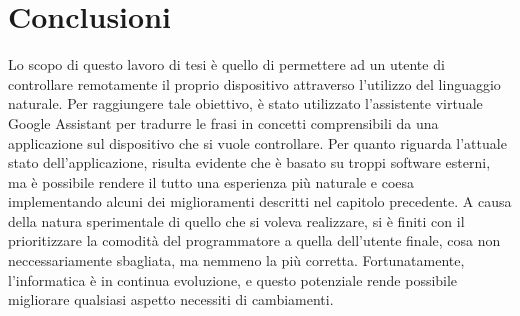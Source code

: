 \chapter{Conclusioni}
Lo scopo di questo lavoro di tesi è quello di permettere ad un utente di controllare remotamente il proprio dispositivo attraverso l'utilizzo del linguaggio naturale. 
Per raggiungere tale obiettivo, è stato utilizzato l'assistente virtuale Google Assistant per tradurre le frasi in concetti comprensibili da una applicazione sul dispositivo che si vuole controllare. 
Per quanto riguarda l'attuale stato dell'applicazione, risulta evidente che è basato su troppi software esterni, ma è possibile rendere il tutto una esperienza più naturale e coesa implementando alcuni dei miglioramenti descritti nel capitolo precedente. 
A causa della natura sperimentale di quello che si voleva realizzare, si è finiti con il prioritizzare la comodità del programmatore a quella dell'utente finale, cosa non neccessariamente sbagliata, ma nemmeno la più corretta. 
Fortunatamente, l'informatica è in continua evoluzione, e questo potenziale rende possibile migliorare qualsiasi aspetto necessiti di cambiamenti.